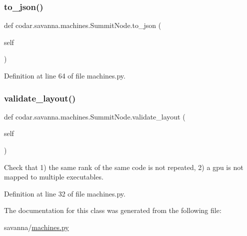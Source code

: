 \subsubsection{\texorpdfstring{to\+\_\+json()}{to\_json()}}
{\footnotesize\ttfamily def codar.\+savanna.\+machines.\+Summit\+Node.\+to\+\_\+json (\begin{DoxyParamCaption}\item[{}]{self }\end{DoxyParamCaption})}



Definition at line 64 of file machines.\+py.

\mbox{\label{classcodar_1_1savanna_1_1machines_1_1_summit_node_a3360461b2a21624400e0ecdf052c8447}} 
\subsubsection{\texorpdfstring{validate\+\_\+layout()}{validate\_layout()}}
{\footnotesize\ttfamily def codar.\+savanna.\+machines.\+Summit\+Node.\+validate\+\_\+layout (\begin{DoxyParamCaption}\item[{}]{self }\end{DoxyParamCaption})}

\begin{DoxyVerb}Check that 1) the same rank of the same code is not repeated,
2) a gpu is not mapped to multiple executables.\end{DoxyVerb}
 

Definition at line 32 of file machines.\+py.



The documentation for this class was generated from the following file\+:\begin{DoxyCompactItemize}
\item 
savanna/\hyperlink{machines_8py}{machines.\+py}\end{DoxyCompactItemize}
